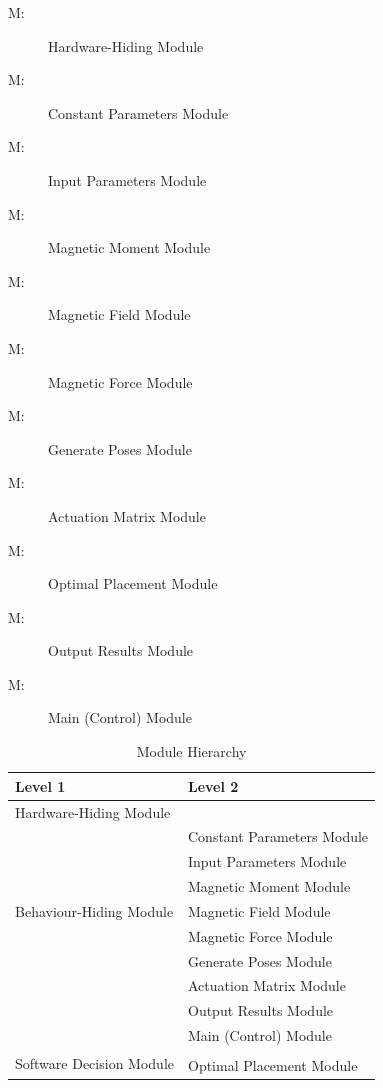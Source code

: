 \documentclass[12pt, titlepage]{article}
\newcounter{mnum}
\newcommand{\mthemnum}{M\themnum}
\begin{document}
\begin{description}
\item [ \mthemnum \label{mHH}:] Hardware-Hiding Module
\item [ \mthemnum \label{mConsParams}:] Constant Parameters Module
\item [ \mthemnum \label{mInputParams}:] Input Parameters Module
\item [ \mthemnum \label{mMagMoment}:] Magnetic Moment Module
\item [ \mthemnum \label{mMagField}:] Magnetic Field Module
\item [ \mthemnum \label{mMagForce}:] Magnetic Force Module
\item [ \mthemnum \label{mGenPoses}:] Generate Poses Module
\item [ \mthemnum \label{mActMatrix}:] Actuation Matrix Module
\item [ \mthemnum \label{mOptPlacement}:] Optimal Placement Module
\item [ \mthemnum \label{mResults}:] Output Results Module
\item [ \mthemnum \label{mControl}:] Main (Control) Module
\end{description}

\begin{table}[h!]
\centering
\begin{tabular}{p{} p{}}
\toprule
\textbf{Level 1} & \textbf{Level 2}\\
\midrule

{Hardware-Hiding Module} & ~ \\
\midrule

\multirow{7}{0.3\textwidth}{Behaviour-Hiding Module} & Constant Parameters Module\\
& Input Parameters Module\\
& Magnetic Moment Module\\
& Magnetic Field Module\\
& Magnetic Force Module\\
& Generate Poses Module\\
& Actuation Matrix Module\\
& Output Results Module\\ 
& Main (Control) Module\\
\midrule

\multirow{3}{0.3\textwidth}{Software Decision Module} & \\
& Optimal Placement Module\\
\bottomrule

\end{tabular}
\caption{Module Hierarchy}
\label{TblMH}
\end{table}
\end{document}
